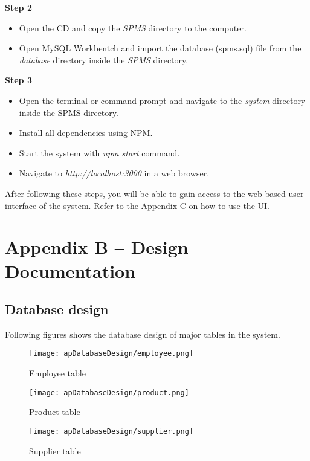 \documentclass[12pt]{report}
\begin{document}
\noindent
{\large{\bf{Step 2}}}
\begin{itemize}
	\item Open the CD and copy the {\it{SPMS}} directory to the computer.
	\item Open MySQL Workbentch and import the database (spms.sql) file from the {\it{database}} directory inside the {\it{SPMS}} directory.
\end{itemize}

\noindent
{\large{\bf{Step 3}}}
\begin{itemize}
	\item Open the terminal or command prompt and navigate to the {\it{system}} directory inside the SPMS directory.
	\item Install all dependencies using NPM.
	\item Start the system with {\it{npm start}} command.
	\item Navigate to {\it{http://localhost:3000}} in a web browser.
\end{itemize}

After following these steps, you will be able to gain access to the web-based user interface of the system. Refer to the Appendix C on how to use the UI.

\setcounter{chapter}{2}
\setcounter{section}{0}
\setcounter{figure}{0}
\chapter*{\Huge Appendix B – Design Documentation}

\section{Database design}
Following figures shows the database design of major tables in the system.

\begin{figure}[H]
	\centering
	\texttt{[image: apDatabaseDesign/employee.png]}
	\caption{Employee table}
\end{figure}

\begin{figure}[H]
	\centering
	\texttt{[image: apDatabaseDesign/product.png]}
	\caption{Product table}
\end{figure}

\begin{figure}[H]
	\centering
	\texttt{[image: apDatabaseDesign/supplier.png]}
	\caption{Supplier table}
\end{figure}
\end{document}
